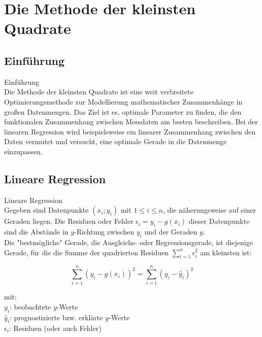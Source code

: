 \section{Die Methode der kleinsten Quadrate}

\subsection{Einführung}
\begin{concept}{Einführung}\\
Die Methode der kleinsten Quadrate ist eine weit verbreitete Optimierungsmethode zur Modellierung mathematischer Zusammenhänge in großen Datenmengen. Das Ziel ist es, optimale Parameter zu finden, die den funktionalen Zusammenhang zwischen Messdaten am besten beschreiben. Bei der linearen Regression wird beispielsweise ein linearer Zusammenhang zwischen den Daten vermutet und versucht, eine optimale Gerade in die Datenmenge einzupassen.
\end{concept}

\subsection{Lineare Regression}

\begin{definition}{Lineare Regression}\\
Gegeben sind Datenpunkte $(x_i; y_i)$ mit $1 \leq i \leq n$, die näherungsweise auf einer Geraden liegen. Die Residuen oder Fehler $\epsilon_i = y_i - g(x_i)$ dieser Datenpunkte sind die Abstände in $y$-Richtung zwischen $y_i$ und der Geraden $g$.\\

Die "bestmögliche" Gerade, die Ausgleichs- oder Regressionsgerade, ist diejenige Gerade, für die die Summe der quadrierten Residuen $\sum_{i=1}^n \epsilon_i^2$ am kleinsten ist:

\[\sum_{i=1}^n (y_i - g(x_i))^2 = \sum_{i=1}^n (y_i - \hat{y}_i)^2\]

mit:\\
$y_i$: beobachtete $y$-Werte\\
$\hat{y}_i$: prognostizierte bzw. erklärte $y$-Werte\\
$\epsilon_i$: Residuen (oder auch Fehler)\\
\end{definition}

